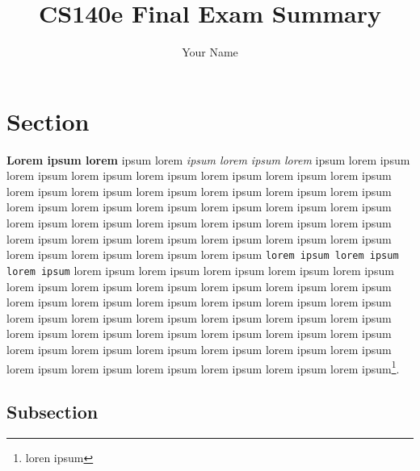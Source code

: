 \documentclass[10pt,twocolumn]{article}
\begin{document}
\setlength{\droptitle}{-4em}
\setlength{\columnsep}{0.85cm}
\pretitle{\begin{center}\LARGE\bf}
\posttitle{\par\end{center}}
\postauthor{\end{tabular}\par\end{center}\vspace*{-1cm}}

\title{CS140e Final Exam Summary}
\author{Your Name}
\date{}
\maketitle
\thispagestyle{empty}

\section{Section}

\textbf{Lorem ipsum lorem} ipsum lorem \textit{ipsum lorem ipsum lorem} ipsum
lorem ipsum lorem ipsum lorem ipsum lorem ipsum lorem ipsum lorem ipsum lorem
ipsum lorem ipsum lorem ipsum lorem ipsum lorem ipsum lorem ipsum lorem ipsum
lorem ipsum lorem ipsum lorem ipsum lorem ipsum lorem ipsum lorem ipsum lorem
ipsum lorem ipsum lorem ipsum lorem ipsum lorem ipsum lorem ipsum lorem ipsum
lorem ipsum lorem ipsum lorem ipsum lorem ipsum lorem ipsum lorem ipsum lorem
ipsum lorem ipsum lorem ipsum \texttt{lorem ipsum lorem ipsum lorem ipsum} lorem
ipsum lorem ipsum lorem ipsum lorem ipsum lorem ipsum lorem ipsum lorem ipsum
lorem ipsum lorem ipsum lorem ipsum lorem ipsum lorem ipsum lorem ipsum lorem
ipsum lorem ipsum lorem ipsum lorem ipsum lorem ipsum lorem ipsum lorem ipsum
lorem ipsum lorem ipsum lorem ipsum lorem ipsum lorem ipsum lorem ipsum lorem
ipsum lorem ipsum lorem ipsum lorem ipsum lorem ipsum lorem ipsum lorem ipsum
lorem ipsum lorem ipsum lorem ipsum lorem ipsum lorem ipsum lorem ipsum lorem
ipsum lorem ipsum\footnote{loren ipsum}.

\subsection{Subsection}
\end{document}
